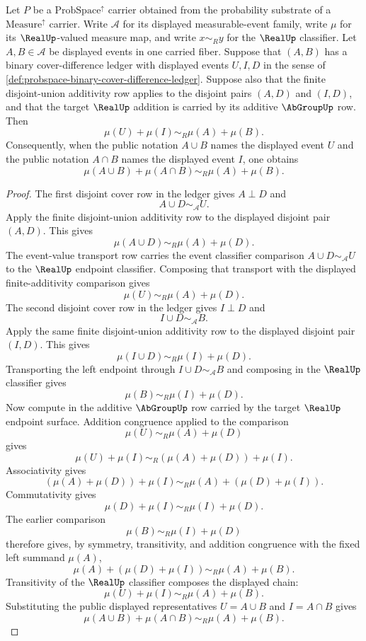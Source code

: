 \begin{theorem}
\label{thm:probspace-binary-inclusion-exclusion-identity}
Let $P$ be a $\mathrm{ProbSpace}^{\uparrow}$ carrier obtained from the probability substrate of a $\mathrm{Measure}^{\uparrow}$ carrier. Write $\mathcal A$ for its displayed measurable-event family, write $\mu$ for its $\RealUp$-valued measure map, and write $x \sim_R y$ for the $\RealUp$ classifier. Let $A,B \in \mathcal A$ be displayed events in one carried fiber. Suppose that $(A,B)$ has a binary cover-difference ledger with displayed events $U,I,D$ in the sense of \autoref{def:probspace-binary-cover-difference-ledger}. Suppose also that the finite disjoint-union additivity row applies to the disjoint pairs $(A,D)$ and $(I,D)$, and that the target $\RealUp$ addition is carried by its additive $\AbGroupUp$ row. Then
$$
\mu(U)+\mu(I)\sim_R\mu(A)+\mu(B).
$$
Consequently, when the public notation $A\cup B$ names the displayed event $U$ and the public notation $A\cap B$ names the displayed event $I$, one obtains
$$
\mu(A\cup B)+\mu(A\cap B)\sim_R\mu(A)+\mu(B).
$$
\end{theorem}
\begin{proof}
The first disjoint cover row in the ledger gives $A \perp D$ and
$$
A\cup D \sim_{\mathcal A} U.
$$
Apply the finite disjoint-union additivity row to the displayed disjoint pair $(A,D)$. This gives
$$
\mu(A\cup D)\sim_R\mu(A)+\mu(D).
$$
The event-value transport row carries the event classifier comparison $A\cup D \sim_{\mathcal A} U$ to the $\RealUp$ endpoint classifier. Composing that transport with the displayed finite-additivity comparison gives
$$
\mu(U)\sim_R\mu(A)+\mu(D).
$$
The second disjoint cover row in the ledger gives $I \perp D$ and
$$
I\cup D \sim_{\mathcal A} B.
$$
Apply the same finite disjoint-union additivity row to the displayed disjoint pair $(I,D)$. This gives
$$
\mu(I\cup D)\sim_R\mu(I)+\mu(D).
$$
Transporting the left endpoint through $I\cup D \sim_{\mathcal A} B$ and composing in the $\RealUp$ classifier gives
$$
\mu(B)\sim_R\mu(I)+\mu(D).
$$
Now compute in the additive $\AbGroupUp$ row carried by the target $\RealUp$ endpoint surface. Addition congruence applied to the comparison
$$
\mu(U)\sim_R\mu(A)+\mu(D)
$$
gives
$$
\mu(U)+\mu(I)\sim_R(\mu(A)+\mu(D))+\mu(I).
$$
Associativity gives
$$
(\mu(A)+\mu(D))+\mu(I)\sim_R\mu(A)+(\mu(D)+\mu(I)).
$$
Commutativity gives
$$
\mu(D)+\mu(I)\sim_R\mu(I)+\mu(D).
$$
The earlier comparison
$$
\mu(B)\sim_R\mu(I)+\mu(D)
$$
therefore gives, by symmetry, transitivity, and addition congruence with the fixed left summand $\mu(A)$,
$$
\mu(A)+(\mu(D)+\mu(I))\sim_R\mu(A)+\mu(B).
$$
Transitivity of the $\RealUp$ classifier composes the displayed chain:
$$
\mu(U)+\mu(I)\sim_R\mu(A)+\mu(B).
$$
Substituting the public displayed representatives $U=A\cup B$ and $I=A\cap B$ gives
$$
\mu(A\cup B)+\mu(A\cap B)\sim_R\mu(A)+\mu(B).
$$
\end{proof}

